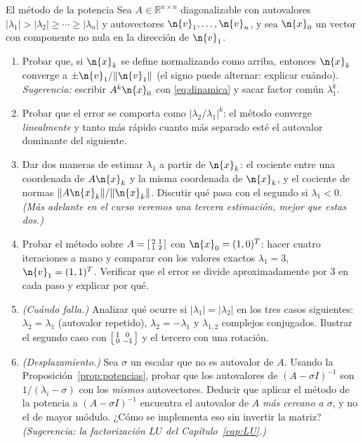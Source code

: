 \begin{entrega}{El método de la potencia}\label{ent:potencia}
Sea $A\in\mathbb{R}^{n\times n}$ diagonalizable con autovalores
$|\lambda_1|>|\lambda_2|\ge\cdots\ge|\lambda_n|$ y autovectores
$\n{v}_1,\dots,\n{v}_n$, y sea $\n{x}_0$ un vector con componente no nula en la
dirección de $\n{v}_1$.

\begin{enumerate}[label=\textbf{(\alph*)},itemsep=3pt,topsep=4pt]
\item Probar que, si $\n{x}_k$ se define normalizando como arriba, entonces
$\n{x}_k$ converge a $\pm\n{v}_1/\|\n{v}_1\|$ (el signo puede alternar: explicar
cuándo). \emph{Sugerencia:} escribir $A^k\n{x}_0$ con \eqref{eq:dinamica} y sacar
factor común $\lambda_1^k$.

\item Probar que el error se comporta como $\big|\lambda_2/\lambda_1\big|^{k}$: el
método converge \emph{linealmente} y tanto más rápido cuanto más separado esté el
autovalor dominante del siguiente.

\item Dar dos maneras de estimar $\lambda_1$ a partir de $\n{x}_k$: el cociente entre
una coordenada de $A\n{x}_k$ y la misma coordenada de $\n{x}_k$, y el cociente de
normas $\|A\n{x}_k\|/\|\n{x}_k\|$. Discutir qué pasa con el segundo si $\lambda_1<0$.
\emph{(Más adelante en el curso veremos una tercera estimación, mejor que estas dos.)}

\item Probar el método sobre $A=\begin{bsmallmatrix}2&1\\ 1&2\end{bsmallmatrix}$ con
$\n{x}_0=(1,0)^T$: hacer cuatro iteraciones a mano y comparar con los valores exactos
$\lambda_1=3$, $\n{v}_1=(1,1)^T$. Verificar que el error se divide aproximadamente por
$3$ en cada paso y explicar por qué.

\item \emph{(Cuándo falla.)} Analizar qué ocurre si $|\lambda_1|=|\lambda_2|$ en los
tres casos siguientes: $\lambda_2=\lambda_1$ (autovalor repetido), $\lambda_2=-\lambda_1$
y $\lambda_{1,2}$ complejos conjugados. Ilustrar el segundo caso con
$\begin{bsmallmatrix}1&0\\ 0&-1\end{bsmallmatrix}$ y el tercero con una rotación.

\item \emph{(Desplazamiento.)} Sea $\sigma$ un escalar que no es autovalor de $A$.
Usando la Proposición~\ref{prop:potencias}, probar que los autovalores de
$(A-\sigma I)^{-1}$ son $1/(\lambda_i-\sigma)$ con los \emph{mismos} autovectores.
Deducir que aplicar el método de la potencia a $(A-\sigma I)^{-1}$ encuentra el
autovalor de $A$ \emph{más cercano a $\sigma$}, y no el de mayor módulo. ¿Cómo se
implementa eso sin invertir la matriz? \emph{(Sugerencia: la factorización $LU$ del
Capítulo~\ref{cap:LU}.)}
\end{enumerate}


\end{entrega}
